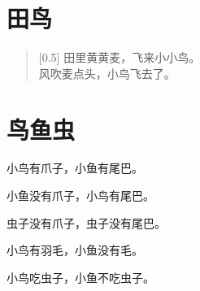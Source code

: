 \documentclass[12pt,UTF-8,openany]{ctexbook}
\begin{document}
\hanzibox{}\hanzibox{}\hanzibox{}\hanzibox{}\hspace{1em}\hanzibox{}\hanzibox{}\hanzibox{}\hanzibox{}






\chapter{田鸟}

\begin{large}
    
    \begin{verse}[0.5\linewidth]
        田里黄黄麦，飞来小小鸟。 \\
        风吹麦点头，小鸟飞去了。
    \end{verse}
    
\end{large}


\clearpage

\begin{center}
    
    
    
\end{center}


\hanzibox{}\hanzibox{}\hanzibox{}\hanzibox{}\hspace{1em}\hanzibox{}\hanzibox{}\hanzibox{}\hanzibox{}

\hanzibox{}\hanzibox{}\hanzibox{}\hanzibox{}\hspace{1em}\hanzibox{}\hanzibox{}\hanzibox{}\hanzibox{}

\hanzibox{}\hanzibox{}\hanzibox{}\hanzibox{}\hspace{1em}




\chapter{鸟鱼虫}

\begin{large}
    
    小鸟有爪子，小鱼有尾巴。
    
    小鱼没有爪子，小鸟有尾巴。
    
    虫子没有爪子，虫子没有尾巴。
    
    小鸟有羽毛，小鱼没有毛。
    
    小鸟吃虫子，小鱼不吃虫子。
    
\end{large}
\end{document}
